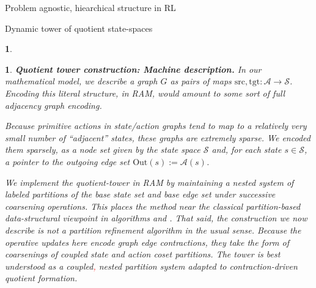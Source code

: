 \documentclass[11pt]{article}
\newtheorem{ermark}[subsubsection]{}
\begin{document}
\begin{section}{Problem agnostic, hiearchical structure in RL}
\begin{subsection}{Dynamic tower of quotient state-spaces}
\begin{ermark}
\end{ermark}

\begin{ermark}
{\bf Quotient tower construction: {\em Machine description}.}
\normalfont
In our mathematical model, we describe a graph $G$ as pairs of maps $\text{src},\text{tgt}:\mathcal{A}\longrightarrow\mathcal{S}$. Encoding this literal structure, in RAM, would amount to some sort of full adjacency graph encoding. 

Because primitive actions in state/action graphs tend to map to a relatively {\em very} small number of ``adjacent'' states, these graphs are extremely sparse. We encoded them sparsely, as a node set given by the state space $\mathcal{S}$ and, for each state $s\in\mathcal{S}$, a pointer to the outgoing edge set $\text{Out}(s):=\mathcal{A}(s)$.

We implement the quotient-tower in RAM by maintaining a nested system of labeled partitions of the base state set and base edge set under successive coarsening operations. This places the method near the classical partition-based data-structural viewpoint in algorithms \cite{PaigeTarjan1987} and \cite{HabibPaulViennot1999}. That said, the construction we now describe is not a {\em partition refinement algorithm} in the usual sense. Because the operative updates here encode graph edge contractions, they take the form of {\em coarsenings} of coupled state and action coset partitions. The tower is best understood as a coupled\textcolor{red}{,} nested partition system adapted to contraction-driven quotient formation.


\end{ermark}
\end{subsection}
\end{section}
\end{document}
